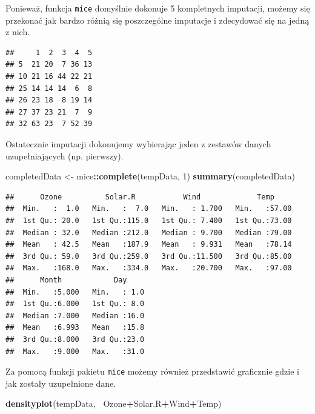 \documentclass[]{book}
\newenvironment{Shaded}{\begin{snugshade}}{\end{snugshade}}
\newcommand{\DecValTok}[1]{\textcolor[rgb]{0.00,0.00,0.81}{#1}}
\newcommand{\KeywordTok}[1]{\textcolor[rgb]{0.13,0.29,0.53}{\textbf{#1}}}
\newcommand{\NormalTok}[1]{#1}
\newcommand{\OperatorTok}[1]{\textcolor[rgb]{0.81,0.36,0.00}{\textbf{#1}}}
\newcommand{\StringTok}[1]{\textcolor[rgb]{0.31,0.60,0.02}{#1}}
\theoremstyle{plain}
\theoremstyle{definition}
\theoremstyle{definition}
\theoremstyle{definition}
\theoremstyle{definition}
\theoremstyle{remark}
\begin{document}
Ponieważ, funkcja \texttt{mice} domyślnie dokonuje 5 kompletnych imputacji, możemy się przekonać jak bardzo różnią się poszczególne imputacje i zdecydować się na jedną z nich.

\begin{Shaded}
\end{Shaded}

\begin{verbatim}
##     1  2  3  4  5
## 5  21 20  7 36 13
## 10 21 16 44 22 21
## 25 14 14 14  6  8
## 26 23 18  8 19 14
## 27 37 23 21  7  9
## 32 63 23  7 52 39
\end{verbatim}

Ostatecznie imputacji dokonujemy wybierając jeden z zestawów danych uzupełniających (np. pierwszy).

\begin{Shaded}
\begin{Highlighting}[]
\NormalTok{completedData <-}\StringTok{ }\NormalTok{mice}\OperatorTok{::}\KeywordTok{complete}\NormalTok{(tempData, }\DecValTok{1}\NormalTok{)}
\KeywordTok{summary}\NormalTok{(completedData)}
\end{Highlighting}
\end{Shaded}

\begin{verbatim}
##      Ozone          Solar.R           Wind             Temp      
##  Min.   :  1.0   Min.   :  7.0   Min.   : 1.700   Min.   :57.00  
##  1st Qu.: 20.0   1st Qu.:115.0   1st Qu.: 7.400   1st Qu.:73.00  
##  Median : 32.0   Median :212.0   Median : 9.700   Median :79.00  
##  Mean   : 42.5   Mean   :187.9   Mean   : 9.931   Mean   :78.14  
##  3rd Qu.: 59.0   3rd Qu.:259.0   3rd Qu.:11.500   3rd Qu.:85.00  
##  Max.   :168.0   Max.   :334.0   Max.   :20.700   Max.   :97.00  
##      Month            Day      
##  Min.   :5.000   Min.   : 1.0  
##  1st Qu.:6.000   1st Qu.: 8.0  
##  Median :7.000   Median :16.0  
##  Mean   :6.993   Mean   :15.8  
##  3rd Qu.:8.000   3rd Qu.:23.0  
##  Max.   :9.000   Max.   :31.0
\end{verbatim}

Za pomocą funkcji pakietu \texttt{mice} możemy również przedstawić graficznie gdzie i jak zostały uzupełnione dane.

\begin{Shaded}
\begin{Highlighting}[]
\KeywordTok{densityplot}\NormalTok{(tempData, }\OperatorTok{~}\NormalTok{Ozone}\OperatorTok{+}\NormalTok{Solar.R}\OperatorTok{+}\NormalTok{Wind}\OperatorTok{+}\NormalTok{Temp)}
\end{Highlighting}
\end{Shaded}
\end{document}
